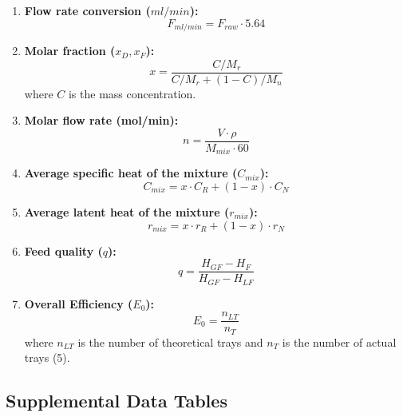 \begin{enumerate}
    \item \textbf{Flow rate conversion ($ml/min$):}
          \begin{equation}
              F_{ml/min} = F_{raw} \cdot 5.64
          \end{equation}

    \item \textbf{Molar fraction ($x_D, x_F$):}
          \begin{equation}
              x = \frac{C/M_r}{C/M_r + (1-C)/M_n}
          \end{equation}
          where $C$ is the mass concentration.

    \item \textbf{Molar flow rate (mol/min):}
          \begin{equation}
              n = \frac{V \cdot \rho}{M_{mix} \cdot 60}
          \end{equation}

    \item \textbf{Average specific heat of the mixture ($C_{mix}$):}
          \begin{equation}
              C_{mix} = x \cdot C_R + (1-x) \cdot C_N
          \end{equation}

    \item \textbf{Average latent heat of the mixture ($r_{mix}$):}
          \begin{equation}
              r_{mix} = x \cdot r_R + (1-x) \cdot r_N
          \end{equation}

    \item \textbf{Feed quality ($q$):}
          \begin{equation}
              q = \frac{H_{GF} - H_F}{H_{GF} - H_{LF}}
          \end{equation}

    \item \textbf{Overall Efficiency ($E_0$):}
          \begin{equation}
              E_0 = \frac{n_{LT}}{n_T}
          \end{equation}
          where $n_{LT}$ is the number of theoretical trays and $n_T$ is the number of actual trays (5).
\end{enumerate}

\subsection{Supplemental Data Tables}


